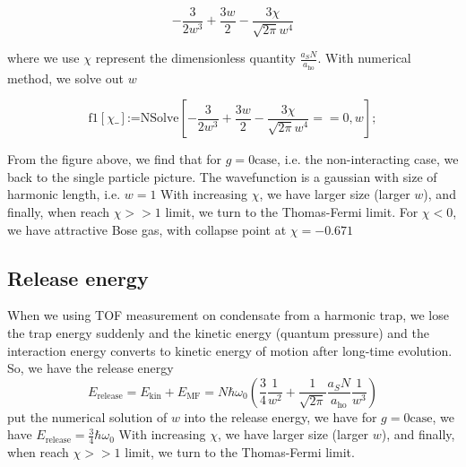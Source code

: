 \begin{doublespace}
\noindent
\begin{equation}
-\frac{3}{2 w^3}+\frac{3 w}{2}-\frac{3 \chi }{\sqrt{2 \pi } w^4}
\end{equation}
\end{doublespace}
where we use $\chi $ represent the dimensionless quantity $\frac{a_SN}{a_{\text{ho}}}$.
With numerical method, we solve out $w$
\begin{doublespace}
\noindent
\begin{equation}
{\text{f1}[\chi \_]\text{:=}\text{NSolve}\left[-\frac{3}{2 w^3}+\frac{3 w}{2}-\frac{3 \chi }{\sqrt{2 \pi } w^4}==0,w\right];}
\end{equation}
\end{doublespace}
From the figure above, we find that for $g=0 \text{case}$, i.e. the non-interacting case, we back to the single particle picture. The wavefunction is a gaussian with size of harmonic length, i.e. $w=1$ With increasing $\chi $, we have larger size (larger $w$), and finally, when reach $\chi >>1$ limit, we turn to the Thomas-Fermi limit.
For $\chi <0$, we have attractive Bose gas, with collapse point at $\chi =-0.671$

\subsection{Release energy}
When we using TOF measurement on condensate from a harmonic trap, we lose the trap energy suddenly and the kinetic energy (quantum pressure) and the interaction energy converts to kinetic energy of motion after long-time evolution.
So, we have the release energy 
\begin{equation}
E_{\text{release}}=E_{\text{kin}}+E_{\text{MF}}=N \hbar  \omega _0\left(\frac{3}{4}\frac{1}{w^2}+\frac{1}{\sqrt{2\pi }}\frac{a_SN}{a_{\text{ho}}}\frac{1}{w^3}\right)
\end{equation}
put the numerical solution of $w$ into the release energy, we have for $g=0 \text{case}$, we have $E_{\text{release}}=\frac{3}{4}\hbar  \omega _0$
With increasing $\chi $, we have larger size (larger $w$), and finally, when reach $\chi >>1$ limit, we turn to the Thomas-Fermi limit.


